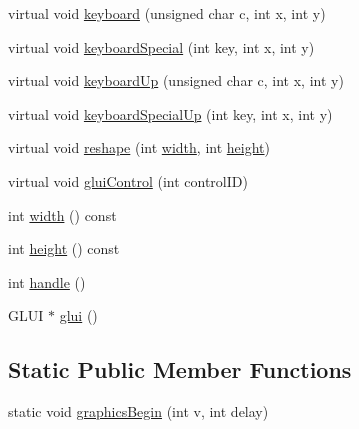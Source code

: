 \begin{DoxyCompactItemize}
\item 
virtual void \hyperlink{classBaseGfxApp_a6d91e0cb7a3d48cad33956efe7eb36ca}{keyboard} (unsigned char c, int x, int y)
\item 
virtual void \hyperlink{classBaseGfxApp_a345566e62c9e4ec3705ec4d1c4c75f1f}{keyboard\-Special} (int key, int x, int y)
\item 
virtual void \hyperlink{classBaseGfxApp_acc4a40ce11edd6b6660a19cb4802a2bf}{keyboard\-Up} (unsigned char c, int x, int y)
\item 
virtual void \hyperlink{classBaseGfxApp_afd14b435ff93b1e7f461cb8bd1a6fd59}{keyboard\-Special\-Up} (int key, int x, int y)
\item 
virtual void \hyperlink{classBaseGfxApp_a5d8d5d778a8aecd7f5f8e9c87f4c3d20}{reshape} (int \hyperlink{classBaseGfxApp_ace089a1a94fb6bb0bc17e1b7fa48e05d}{width}, int \hyperlink{classBaseGfxApp_aa253dbe16a20c40e0a1bf8ff942ceea3}{height})
\item 
virtual void \hyperlink{classBaseGfxApp_a2978a7c358794c67df73b66776b2cef3}{glui\-Control} (int control\-I\-D)
\item 
int \hyperlink{classBaseGfxApp_ace089a1a94fb6bb0bc17e1b7fa48e05d}{width} () const 
\item 
int \hyperlink{classBaseGfxApp_aa253dbe16a20c40e0a1bf8ff942ceea3}{height} () const 
\item 
int \hyperlink{classBaseGfxApp_ae9779f948eff6f45beec08091e98a803}{handle} ()
\item 
G\-L\-U\-I $\ast$ \hyperlink{classBaseGfxApp_ac721a0fedce80308c5c0e5695016e95d}{glui} ()
\end{DoxyCompactItemize}
\subsection*{Static Public Member Functions}
\begin{DoxyCompactItemize}
\item 
static void \hyperlink{classBaseGfxApp_a4faec5e773876411a8b1912b0c1a0080}{graphics\-Begin} (int v, int delay)
\end{DoxyCompactItemize}

